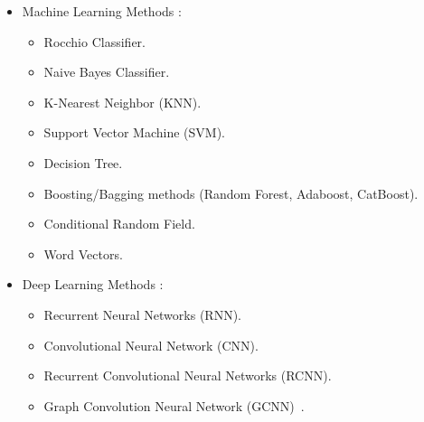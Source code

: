 \begin{itemize}
    \item Machine Learning Methods :
        \begin{itemize}
            \item Rocchio Classifier.
            \item Naive Bayes Classifier.
            \item K-Nearest Neighbor (KNN).
            \item Support Vector Machine (SVM).
            \item Decision Tree.
            \item Boosting/Bagging methods (Random Forest, Adaboost, CatBoost).
            \item Conditional Random Field.
            \item Word Vectors.
        \end{itemize}
    \item Deep Learning Methods :        
        \begin{itemize}
            \item Recurrent Neural Networks (RNN).
            \item Convolutional Neural Network (CNN).
            \item Recurrent Convolutional Neural Networks (RCNN).
            \item Graph Convolution Neural Network (GCNN)~\cite{paper-graph-convolution-network}.
        \end{itemize}
\end{itemize}


















